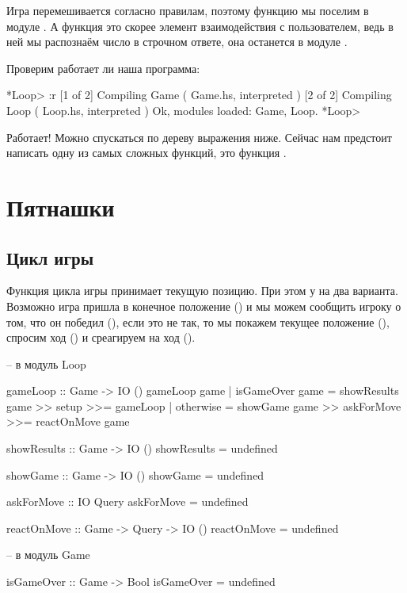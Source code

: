 Игра перемешивается согласно правилам, поэтому функцию
 мы поселим в модуле . А функция 
 это скорее элемент взаимодействия с пользователем,
ведь в ней мы распознаём число в строчном ответе, 
она останется в модуле .

Проверим работает ли наша программа:


\begin{code}
*Loop> :r
[1 of 2] Compiling Game             ( Game.hs, interpreted )
[2 of 2] Compiling Loop             ( Loop.hs, interpreted )
Ok, modules loaded: Game, Loop.
*Loop> 
\end{code}

Работает! Можно спускаться по дереву выражения ниже. 
Сейчас нам предстоит написать одну из самых сложных 
функций, это функция .

\section{Пятнашки}

\subsection{Цикл игры}

Функция цикла игры принимает текущую позицию. При этом
у на два варианта. Возможно игра пришла в конечное положение
() и мы можем сообщить игроку о том, что 
он победил (), если это не так, то мы 
покажем текущее положение (),
спросим ход () и среагируем на ход 
().

\begin{code}
-- в модуль Loop

gameLoop :: Game -> IO ()
gameLoop game 
    | isGameOver game   = showResults game >> setup >>= gameLoop
    | otherwise         = showGame game >> askForMove >>= reactOnMove game


showResults :: Game -> IO ()
showResults = undefined

showGame :: Game -> IO ()
showGame = undefined

askForMove :: IO Query
askForMove = undefined

reactOnMove :: Game -> Query -> IO ()
reactOnMove = undefined

-- в модуль Game

isGameOver :: Game -> Bool
isGameOver = undefined
\end{code}

